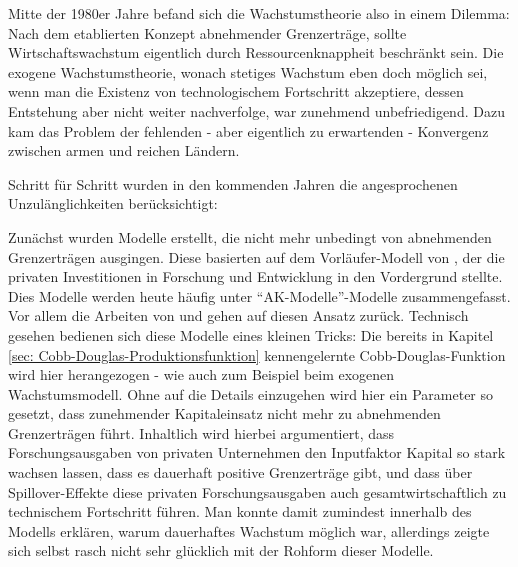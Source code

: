 Mitte der 1980er Jahre befand sich die Wachstumstheorie also in einem Dilemma: Nach dem etablierten Konzept abnehmender Grenzerträge, sollte Wirtschaftswachstum eigentlich durch Ressourcenknappheit beschränkt sein. Die exogene Wachstumstheorie, wonach stetiges Wachstum eben doch möglich sei, wenn man die Existenz von technologischem Fortschritt akzeptiere, dessen Entstehung aber nicht weiter nachverfolge, war zunehmend unbefriedigend. Dazu kam das Problem der fehlenden - aber eigentlich zu erwartenden - Konvergenz zwischen armen und reichen Ländern. 

Schritt für Schritt wurden in den kommenden Jahren die angesprochenen Unzulänglichkeiten berücksichtigt:

Zunächst wurden Modelle erstellt, die nicht mehr unbedingt von abnehmenden Grenzerträgen ausgingen. Diese basierten auf dem Vorläufer-Modell von \textcite{Arrow1962}, der die privaten Investitionen in Forschung und Entwicklung in den Vordergrund stellte. Dies Modelle werden heute häufig unter "`AK-Modelle"'-Modelle zusammengefasst. Vor allem die Arbeiten von \textcite{Romer1986} und \textcite{Rebelo1991} gehen auf diesen Ansatz zurück. Technisch gesehen bedienen sich diese Modelle eines kleinen Tricks: Die bereits in Kapitel \ref{sec: Cobb-Douglas-Produktionsfunktion} kennengelernte Cobb-Douglas-Funktion wird hier herangezogen - wie auch zum Beispiel beim exogenen Wachstumsmodell. Ohne auf die Details einzugehen wird hier ein Parameter so gesetzt, dass zunehmender Kapitaleinsatz nicht mehr zu abnehmenden Grenzerträgen führt. Inhaltlich wird hierbei argumentiert\parencite{Romer1994}, dass Forschungsausgaben von privaten Unternehmen den Inputfaktor Kapital so stark wachsen lassen, dass es dauerhaft positive Grenzerträge gibt, und dass über Spillover-Effekte diese privaten Forschungsausgaben auch gesamtwirtschaftlich zu technischem Fortschritt führen. Man konnte damit zumindest innerhalb des Modells erklären, warum dauerhaftes Wachstum möglich war, allerdings zeigte sich \textcite[S. 15]{Romer1994} selbst rasch nicht sehr glücklich mit der Rohform dieser Modelle.


